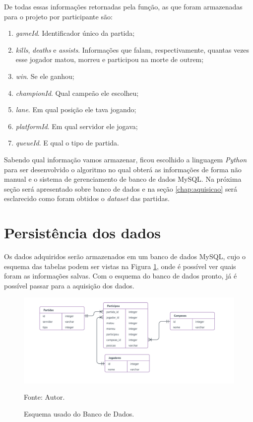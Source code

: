 De todas essas informações retornadas pela função, as que foram armazenadas para o projeto por participante são:

\begin{enumerate}
\item \textit{gameId}. Identificador único da partida;
\item \textit{kills}, \textit{deaths} e \textit{assists}. Informações que falam, respectivamente, quantas vezes esse jogador matou, morreu e participou na morte de outrem;
\item \textit{win}. Se ele ganhou;
\item \textit{championId}. Qual campeão ele escolheu;
\item \textit{lane}. Em qual posição ele tava jogando;
\item \textit{platformId}. Em qual servidor ele jogava;
\item \textit{queueId}. E qual o tipo de partida.
\end{enumerate}

Sabendo qual informação vamos armazenar, ficou escolhido a linguagem \textit{Python} para ser desenvolvido o algoritmo no qual obterá as informações de forma não manual e o sistema de gerenciamento de banco de dados MySQL. Na próxima seção será apresentado sobre banco de dados e na seção \ref{chap:aquisicao} será esclarecido como foram obtidos o \textit{dataset} das partidas. 


\section{Persistência dos dados}
Os dados adquiridos serão armazenados em um banco de dados MySQL, cujo o esquema das tabelas podem ser vistas na Figura \ref{fig:bd}, onde é possível ver quais foram as informações salvas. Com o esquema do banco de dados pronto, já é possível passar para a aquisição dos dados.
\begin{figure}[H]
	\caption{Esquema usado do Banco de Dados.}
	\begin{center}
		\includegraphics[width=17cm]{imagens/esquema.png}
	\end{center}
	\small{Fonte: Autor.}
	\label{fig:bd}
\end{figure}


